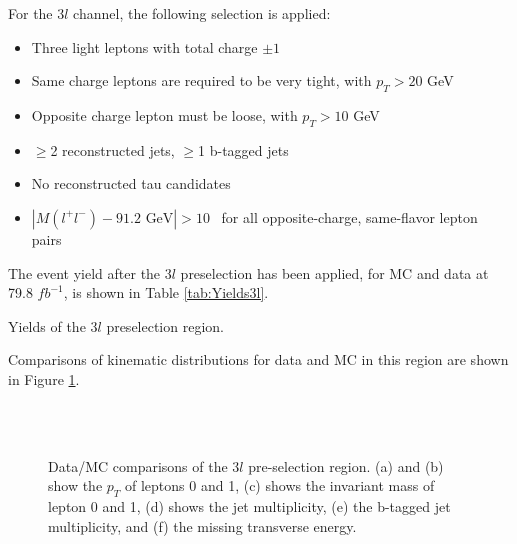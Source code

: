 For the $3l$ channel, the following selection is applied:

\begin{itemize}
  \item Three light leptons with total charge $\pm 1$
  \item Same charge leptons are required to be very tight, with $p_T > 20$ GeV
  \item Opposite charge lepton must be loose, with $p_T > 10$ GeV
  \item $\geq$2 reconstructed jets, $\geq$1 b-tagged jets                                              
  \item No reconstructed tau candidates
  \item $|M(l^+l^-)-91.2\textrm{ GeV}| > 10$~\GeV{} for all opposite-charge, same-flavor lepton pairs
\end{itemize}

The event yield after the $3l$ preselection has been applied, for MC and data at 79.8 $fb^{-1}$, is shown in Table \ref{tab:Yields3l}.

\begin{table}[H]

\label{tab:Yields3l}
\caption{Yields of the $3l$ preselection region.}
\end{table}

Comparisons of kinematic distributions for data and MC in this region are shown in Figure \ref{fig:presel3l}.

\begin{figure}[H]
    \centering
    \\                             
    \\                         
    \caption{Data/MC comparisons of the $3l$ pre-selection region. (a) and (b) show the $p_T$ of leptons 0 and 1, (c) shows the invariant mass of lepton 0 and 1, (d) shows the jet multiplicity, (e) the b-tagged jet multiplicity, and (f) the missing transverse energy.}
    \label{fig:presel3l}                                                                                          
\end{figure}

